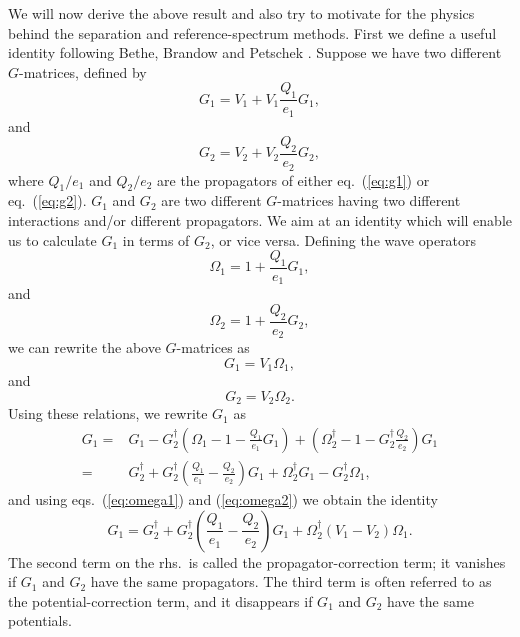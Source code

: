 We will now derive the above result and also try to motivate
for the physics behind the separation and reference-spectrum 
methods.
First we define a useful identity following Bethe, Brandow and
Petschek \cite{bbp63}. Suppose we have two
different $G$-matrices, defined by
\begin{equation}
    G_1=V_1+V_1\frac{Q_1}{e_1}G_1,
\end{equation}
and
\begin{equation}
    G_2=V_2+V_2\frac{Q_2}{e_2}G_2,
\end{equation}
where $Q_1/e_1$ and $Q_2/e_2$ are the propagators of
either eq.\ (\ref{eq:g1}) or eq.\ (\ref{eq:g2}). $G_1$ and $G_2$
are two different $G$-matrices having two different interactions
and/or different propagators. We aim at an identity
which will enable us to calculate $G_1$ in terms of $G_2$,
or vice versa.
Defining the wave operators
\begin{equation}
    \Omega_1=1+\frac{Q_1}{e_1}G_1,
\end{equation}
and
\begin{equation}
    \Omega_2=1+\frac{Q_2}{e_2}G_2,
\end{equation}
we can rewrite the above $G$-matrices as
\begin{equation}
    G_1=V_1\Omega_1,
    \label{eq:omega1}
\end{equation}
and
\begin{equation}
    G_2=V_2\Omega_2.
    \label{eq:omega2}
\end{equation}
Using these relations, we rewrite $G_1$ as
\begin{eqnarray}
   G_1=&G_1 -{\displaystyle 
         G_2^{\dagger}\left(\Omega_1-1-\frac{Q_1}{e_1}G_1\right)
        +\left(\Omega_2^{\dagger}-1-G_2^{\dagger}\frac{Q_2}{e_2}\right)G_1} 
         \nonumber \\
       =&{\displaystyle G_2^{\dagger} +G_2^{\dagger}\left(\frac{Q_1}{e_1}-
        \frac{Q_2}{e_2}\right)G_1
        +\Omega_2^{\dagger}G_1 -G_2^{\dagger}\Omega_1},
\end{eqnarray}
and using eqs.\ (\ref{eq:omega1}) and (\ref{eq:omega2}) we obtain
the identity
\begin{equation}
        G_1=G_2^{\dagger} +G_2^{\dagger}
        \left(\frac{Q_1}{e_1}-\frac{Q_2}{e_2}\right)G_1
        +\Omega_2^{\dagger}(V_1-V_2)\Omega_1.
        \label{eq:gidentity}
\end{equation}
The second term on the rhs.\ is called the propagator-correction term;
it vanishes if $G_1$ and $G_2$ have the same propagators. The third term
is often referred to as the potential-correction term, and it disappears
if $G_1$ and $G_2$  have the same potentials.

